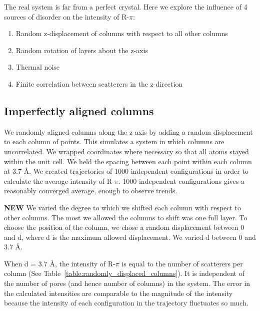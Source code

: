 \documentclass{article}
\begin{document}
  The real system is far from a perfect crystal. Here we explore the influence
  of 4 sources of disorder on the intensity of R-$\pi$:
  \begin{enumerate}
  \item Random z-displacement of columns with respect to all other columns
  \item Random rotation of layers about the z-axis
  \item Thermal noise
  \item Finite correlation between scatterers in the z-direction
  \end{enumerate}

  \subsection{Imperfectly aligned columns}

  We randomly aligned columns along the z-axis by adding a random displacement
  to each column of points. This simulates a system in which columns are
  uncorrelated.  We wrapped coordinates where necessary so that all atoms stayed
  within the unit cell. We held the spacing between each point within each column
  at 3.7 \AA. We created trajectories of 1000 independent
  configurations in order to calculate the average intensity of R-$\pi$. 1000
  independent configurations gives a reasonably converged average, enough to
  observe trends.
 
  \textbf{NEW} We varied the degree to which we shifted each column with
  respect to other columns. The most we allowed the columns to shift was one full
  layer. To choose the position of the column, we chose a random displacement
  between 0 and d, where d is the maximum allowed displacement. We varied d
  between 0 and 3.7 \AA.  

  When d = 3.7 \AA, the intensity of R-$\pi$ is equal to the number of
  scatterers per column (See Table~\ref{table:randomly_displaced_columns}).  It
  is independent of the number of pores (and hence number of columns) in the
  system. The error in the calculated intensities are comparable to the magnitude
  of the intensity because the intensity of each configuration in the trajectory
  fluctuates so much. 
\end{document}
